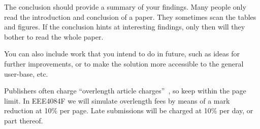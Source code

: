 
The conclusion should provide a summary of your findings.  Many people only read the introduction and conclusion of a paper.  They sometimes scan the tables and figures.  If the conclusion hints at interesting findings, only then will they bother to read the whole paper.

You can also include work that you intend to do in future, such as ideas for further improvements, or to make the solution more accessible to the general user-base, etc.

Publishers often charge ``overlength article charges''~\cite{Overlength_Fee}, so keep within the page limit.  In EEE4084F we will simulate overlength fees by means of a mark reduction at 10\% per page.  Late submissions will be charged at 10\% per day, or part thereof.
